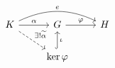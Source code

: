 \documentclass{article}
\begin{document}
    \begin{equation*}
        \begin{tikzcd}
            K \ar[r, "\alpha"] \ar[dr, "\ex!\widetilde{\alpha}", dashed] \ar[rr, "e", bend left=25] & G \ar[r, "\phi"] & H \\
                                                                                                    & \ker\phi \ar[u, "\iota"', hookrightarrow]
        \end{tikzcd}
    \end{equation*}
\end{document}
